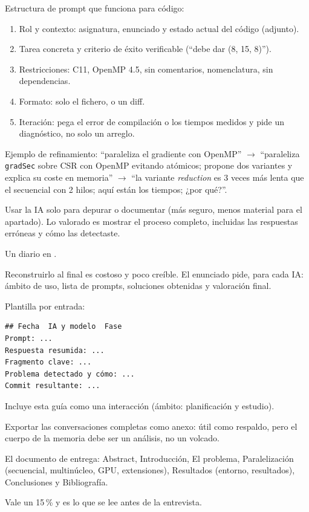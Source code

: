 \como Estructura de prompt que funciona para código:
\begin{enumerate}
\item Rol y contexto: asignatura, enunciado y estado actual del código (adjunto).
\item Tarea concreta y criterio de éxito verificable (``debe dar (8, 15, 8)'').
\item Restricciones: C11, OpenMP 4.5, sin comentarios, nomenclatura, sin dependencias.
\item Formato: solo el fichero, o un diff.
\item Iteración: pega el error de compilación o los tiempos medidos y pide un diagnóstico, no solo un arreglo.
\end{enumerate}
Ejemplo de refinamiento: ``paraleliza el gradiente con OpenMP'' $\rightarrow$ ``paraleliza \texttt{gradSec} sobre CSR con OpenMP evitando atómicos; propone dos variantes y explica su coste en memoria'' $\rightarrow$ ``la variante \emph{reduction} es 3 veces más lenta que el secuencial con 2 hilos; aquí están los tiempos; ¿por qué?''.

\alt Usar la IA solo para depurar o documentar (más seguro, menos material para el apartado). Lo valorado es mostrar el proceso completo, incluidas las respuestas erróneas y cómo las detectaste.

\que Un diario en .

\porque Reconstruirlo al final es costoso y poco creíble. El enunciado pide, para cada IA: ámbito de uso, lista de prompts, soluciones obtenidas y valoración final.

\como Plantilla por entrada:
\begin{lstlisting}
## Fecha  IA y modelo  Fase
Prompt: ...
Respuesta resumida: ...
Fragmento clave: ...
Problema detectado y cómo: ...
Commit resultante: ...
\end{lstlisting}
Incluye esta guía como una interacción (ámbito: planificación y estudio).

\alt Exportar las conversaciones completas como anexo: útil como respaldo, pero el cuerpo de la memoria debe ser un análisis, no un volcado.

\que El documento de entrega: Abstract, Introducción, El problema, Paralelización (secuencial, multinúcleo, GPU, extensiones), Resultados (entorno, resultados), Conclusiones y Bibliografía.

\porque Vale un 15\,\% y es lo que se lee antes de la entrevista.

